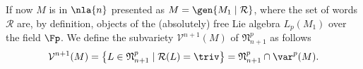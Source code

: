 If now $M$ is in $\nla{n}$ presented as $M=\gen{M_{1}\mid\mathcal{R}}$, where
the set of words $\mathcal{R}$ are, by definition, objects of the (absolutely) free Lie algebra $L_{p}(M_{1})$ over the field $\Fp$. We define the subvariety $\mathcal{V}^{n+1}(M)$ of $\mathfrak{N}
_{n+1}^{p}$ as follows
$$\mathcal{V}^{n+1}(M)=\left\{L\in\mathfrak{N}_{n+1}^{p}\mid\mathcal{R}(L)=\triv\right\}=
\mathfrak{N}_{n+1}^{p}\cap\var^{p}(M).$$

%
%
%
